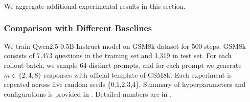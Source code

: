 \documentclass{article}
\theoremstyle{plain}
\theoremstyle{definition}
\theoremstyle{remark}
\begin{document}
We aggregate additional experimental results in this section.

\subsubsection{Comparison with Different Baselines}

We train Qwen2.5-0.5B-Instruct model on GSM8k dataset for 500 steps. GSM8k consists of 7,473 questions in the training set and 1,319 in test set. For each rollout batch, we sample 64 distinct prompts, and for each prompt we generate $m \in \{2, 4, 8\}$ responses with official template of GSM8k. Each experiment is repeated across five random seeds \{0,1,2,3,4\}. Summary of hyperparameters and configurations is provided in . Detailed numbers are in .
\end{document}
